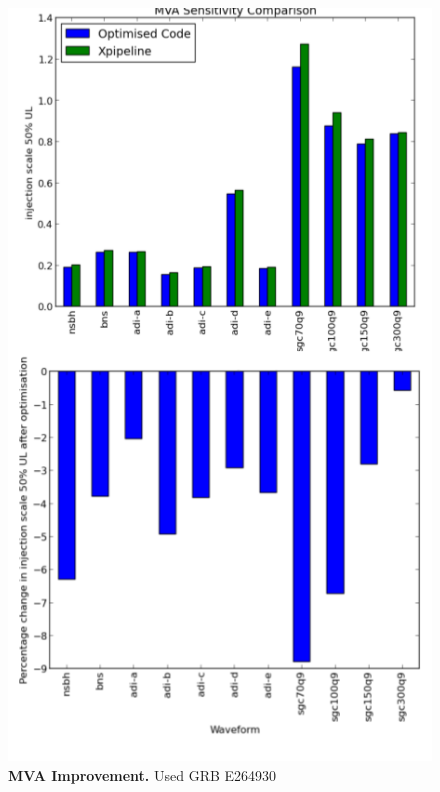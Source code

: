 \documentclass[11pt]{cuthesis}
\begin{document}
\begin{figure} %
\begin{center}
\includegraphics[width=0.8\linewidth]{x_compare.png}
\end{center}
\caption{\textbf{MVA Improvement.} Used GRB E264930  }
\label{fig:x compare}
\end{figure}




\backmatter
\end{document}
